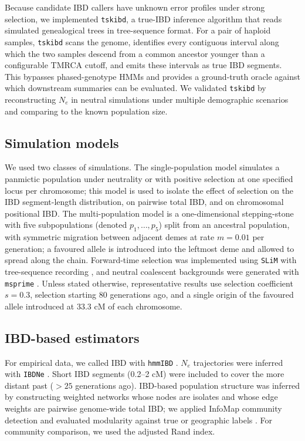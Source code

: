 \documentclass[11pt]{article}
\begin{document}
Because candidate IBD callers have unknown error profiles under strong selection, we implemented \texttt{tskibd}, a true-IBD inference algorithm that reads simulated genealogical trees in tree-sequence format. For a pair of haploid samples, \texttt{tskibd} scans the genome, identifies every contiguous interval along which the two samples descend from a common ancestor younger than a configurable TMRCA cutoff, and emits these intervals as true IBD segments. This bypasses phased-genotype HMMs and provides a ground-truth oracle against which downstream summaries can be evaluated. We validated \texttt{tskibd} by reconstructing $N_e$ in neutral simulations under multiple demographic scenarios and comparing to the known population size.

\subsection{Simulation models}

We used two classes of simulations. The single-population model simulates a panmictic population under neutrality or with positive selection at one specified locus per chromosome; this model is used to isolate the effect of selection on the IBD segment-length distribution, on pairwise total IBD, and on chromosomal positional IBD. The multi-population model is a one-dimensional stepping-stone with five subpopulations (denoted $p_1, \ldots, p_5$) split from an ancestral population, with symmetric migration between adjacent demes at rate $m = 0.01$ per generation; a favoured allele is introduced into the leftmost deme and allowed to spread along the chain. Forward-time selection was implemented using \texttt{SLiM} with tree-sequence recording \citep{haller2019slim,haller2019treeseq}, and neutral coalescent backgrounds were generated with \texttt{msprime} \citep{kelleher2016msprime,baumdicker2022msprime}. Unless stated otherwise, representative results use selection coefficient $s = 0.3$, selection starting $80$ generations ago, and a single origin of the favoured allele introduced at $33.3$ cM of each chromosome.

\subsection{IBD-based estimators}

For empirical data, we called IBD with \texttt{hmmIBD} \citep{schaffner2018hmmibd}. $N_e$ trajectories were inferred with \texttt{IBDNe} \citep{browning2015ibdne}. Short IBD segments (0.2--2 cM) were included to cover the more distant past ($>25$ generations ago). IBD-based population structure was inferred by constructing weighted networks whose nodes are isolates and whose edge weights are pairwise genome-wide total IBD; we applied InfoMap community detection \citep{rosvall2008maps} and evaluated modularity against true or geographic labels \citep{newman2004modularity}. For community comparison, we used the adjusted Rand index.
\end{document}
